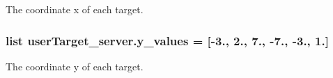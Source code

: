 The coordinate x of each target. 

\subsubsection[{\texorpdfstring{y\+\_\+values}{y_values}}]{\setlength{\rightskip}{0pt plus 5cm}list user\+Target\+\_\+server.\+y\+\_\+values = \mbox{[}-\/3., 2., 7., -\/7., -\/3., 1.\mbox{]}}\hypertarget{namespaceuser_target__server_add80632cb35d626e8af7d47d64f9db2b}{}\label{namespaceuser_target__server_add80632cb35d626e8af7d47d64f9db2b}


The coordinate y of each target. 

